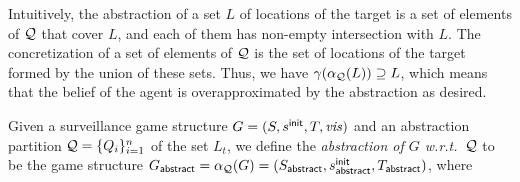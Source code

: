 Intuitively, the abstraction of a set $L$ of locations of the target is a set of elements of $\mathcal{Q}$ that cover $L$, and each of them has non-empty intersection with $L$. The concretization of a set of elements of $\mathcal{Q}$ is the set of locations of the target formed by the union of these sets. Thus, we have $\gamma(\alpha_{\mathcal{Q}}(L))\supseteq L$, which means that the belief of the agent is overapproximated by the abstraction as desired.

Given a surveillance game structure $G  = (S,s^{\mathsf{init}},T,\mathit{vis})$ and an abstraction partition $\mathcal{Q} = \{Q_i\}_{i=1}^n$ of the set $L_t$, we define the \emph{abstraction of $G$ w.r.t.\ $\mathcal{Q}$} to be the game structure 
$G_{\mathsf{abstract}}  = \alpha_{\mathcal{Q}}(G)= (S_{\mathsf{abstract}},s^{\mathsf{init}}_{\mathsf{abstract}},T_{\mathsf{abstract}})$, where

